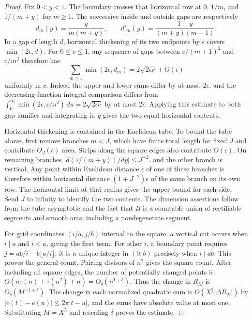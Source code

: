\documentclass[11pt,a4paper,oneside,openany]{report}
\theoremstyle{remark}\newtheorem{remark}[theorem]{Remark}
\numberwithin{equation}{section}
\begin{document}
\begin{proof}
Fix $0<y<1$. The boundary crosses that horizontal row at $0$,
$1/m$, and $1/(m+y)$ for $m\ge1$. The successive inside and outside
gaps are respectively
\[
 d_m(y)=\frac{y}{m(m+y)},\qquad
 d'_m(y)=\frac{1-y}{(m+y)(m+1)}.
\]
In a gap of length $d$, horizontal thickening of its two endpoints
by $\epsilon$ covers $\min(2\epsilon,d)$. For $0\le c\le1$, any
sequence of gaps between $c/(m+1)^2$ and $c/m^2$ therefore has
\[
 \sum_{m\ge1}\min(2\epsilon,d_m)
  =2\sqrt{2\epsilon c}+O(\epsilon)
\]
uniformly in $c$. Indeed the upper and lower sums differ by at most
$2\epsilon$, and the decreasing-function integral comparison differs
from $\int_0^\infty\min(2\epsilon,c/u^2)\,du=2\sqrt{2\epsilon c}$
by at most $2\epsilon$. Applying this estimate to both gap families
and integrating in $y$ gives the two equal horizontal contents.

Horizontal thickening is contained in the Euclidean tube. To bound
the tube above, first remove branches $m<J$, which have finite total
length for fixed $J$ and contribute $O_J(\epsilon)$ area. Strips
along the square edges also contribute $O(\epsilon)$. On remaining
branches $|d(1/(m+y))/dy|\le J^{-2}$, and the other branch is vertical.
Any point within Euclidean distance $\epsilon$ of one of these branches
is therefore within horizontal distance $(1+J^{-2})\epsilon$ of the
same branch on its own row. The horizontal limit at that radius gives
the upper bound for each side. Send $J$ to infinity to identify the
two contents. The dimension assertions follow from the tube asymptotic
and the fact that $B$ is a countable union of rectifiable segments
and smooth arcs, including a nondegenerate segment.

For grid coordinates $(i/a,j/b)$ internal to the square, a vertical
cut occurs when $i\mid a$ and $i<a$, giving the first term. For other
$i$, a boundary point requires
$j=ab/i-b\lfloor a/i\rfloor$; it is a unique integer in $(0,b)$
precisely when $i\mid ab$. This proves the general count. Pairing
divisors of $n^2$ gives the square count. After including all square
edges, the number of potentially changed points is
$O(n\tau(n)+\tau(n^2)+n)=O_\delta(n^{1+\delta})$.
Thus the change in $R_M$ is $O_\delta(M^{-1+\delta})$. The change in
each normalized quadratic sum is $O(X^2|\Delta R_X|)$ by
$|e(t)-e(u)|\le2\pi|t-u|$, and the sums have absolute value at most
one. Substituting $M=X^5$ and rescaling $\delta$ proves the estimate.
\end{proof}
\end{document}
